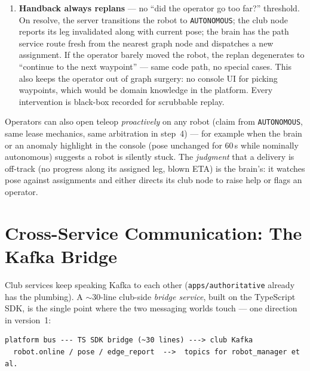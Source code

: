 \documentclass[11pt]{article}
\begin{document}
\begin{enumerate}[itemsep=1pt]
        telemetry; it never re-queues itself off peer-to-peer state. The asymmetry
        matters because the WebRTC path can die while the operator's WSS is healthy
        (a TURN hiccup): if the robot decided for itself, one robot could hold a live
        lease \emph{and} sit in the queue --- exactly the two-drivers ambiguity
        leases exist to kill.
  \item \textbf{Handback always replans} --- no ``did the operator go too far?''
        threshold. On resolve, the server transitions the robot to
        \texttt{AUTONOMOUS}; the club node reports its leg invalidated along with
        current pose; the brain has the path service route fresh from the nearest
        graph node and dispatches a new assignment. If the operator barely moved the
        robot, the replan degenerates to ``continue to the next waypoint'' --- same
        code path, no special cases. This also keeps the operator out of graph
        surgery: no console UI for picking waypoints, which would be domain knowledge
        in the platform. Every intervention is black-box recorded for scrubbable
        replay.
\end{enumerate}

Operators can also open teleop \emph{proactively} on any robot (claim from
\texttt{AUTONOMOUS}, same lease mechanics, same arbitration in step~4) --- for
example when the brain or an anomaly
highlight in the console (pose unchanged for 60\,s while nominally autonomous) suggests
a robot is silently stuck. The \emph{judgment} that a delivery is off-track (no
progress along its assigned leg, blown ETA) is the brain's: it watches pose against
assignments and either directs its club node to raise help or flags an operator.

\section{Cross-Service Communication: The Kafka Bridge}

Club services keep speaking Kafka to each other (\texttt{apps/authoritative} already
has the plumbing). A $\sim$30-line club-side \emph{bridge service}, built on the
TypeScript SDK, is the single point where the two messaging worlds touch --- one
direction in version~1:

\begin{lstlisting}
platform bus --- TS SDK bridge (~30 lines) ---> club Kafka
  robot.online / pose / edge_report  -->  topics for robot_manager et al.
\end{lstlisting}
\end{document}
